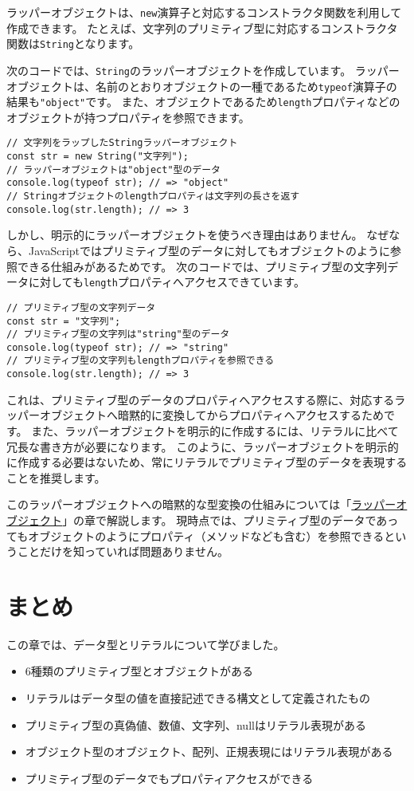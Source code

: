 ラッパーオブジェクトは、\texttt{new}演算子と対応するコンストラクタ関数を利用して作成できます。
たとえば、文字列のプリミティブ型に対応するコンストラクタ関数は\texttt{String}となります。

次のコードでは、\texttt{String}のラッパーオブジェクトを作成しています。
ラッパーオブジェクトは、名前のとおりオブジェクトの一種であるため\texttt{typeof}演算子の結果も\texttt{"object"}です。
また、オブジェクトであるため\texttt{length}プロパティなどのオブジェクトが持つプロパティを参照できます。

\begin{lstlisting}
// 文字列をラップしたStringラッパーオブジェクト
const str = new String("文字列");
// ラッパーオブジェクトは"object"型のデータ
console.log(typeof str); // => "object"
// Stringオブジェクトのlengthプロパティは文字列の長さを返す
console.log(str.length); // => 3
\end{lstlisting}

しかし、明示的にラッパーオブジェクトを使うべき理由はありません。
なぜなら、JavaScriptではプリミティブ型のデータに対してもオブジェクトのように参照できる仕組みがあるためです。
次のコードでは、プリミティブ型の文字列データに対しても\texttt{length}プロパティへアクセスできています。

\begin{lstlisting}
// プリミティブ型の文字列データ
const str = "文字列";
// プリミティブ型の文字列は"string"型のデータ
console.log(typeof str); // => "string"
// プリミティブ型の文字列もlengthプロパティを参照できる
console.log(str.length); // => 3
\end{lstlisting}

これは、プリミティブ型のデータのプロパティへアクセスする際に、対応するラッパーオブジェクトへ暗黙的に変換してからプロパティへアクセスするためです。
また、ラッパーオブジェクトを明示的に作成するには、リテラルに比べて冗長な書き方が必要になります。
このように、ラッパーオブジェクトを明示的に作成する必要はないため、常にリテラルでプリミティブ型のデータを表現することを推奨します。

このラッパーオブジェクトへの暗黙的な型変換の仕組みについては「\hyperlink{wrapper-object}{ラッパーオブジェクト}」の章で解説します。
現時点では、プリミティブ型のデータであってもオブジェクトのようにプロパティ（メソッドなども含む）を参照できるということだけを知っていれば問題ありません。

\hypertarget{data-type-summary}{%
\section{まとめ}\label{data-type-summary}}

この章では、データ型とリテラルについて学びました。

\begin{itemize}
\item
  6種類のプリミティブ型とオブジェクトがある
\item
  リテラルはデータ型の値を直接記述できる構文として定義されたもの
\item
  プリミティブ型の真偽値、数値、文字列、nullはリテラル表現がある
\item
  オブジェクト型のオブジェクト、配列、正規表現にはリテラル表現がある
\item
  プリミティブ型のデータでもプロパティアクセスができる
\end{itemize}
